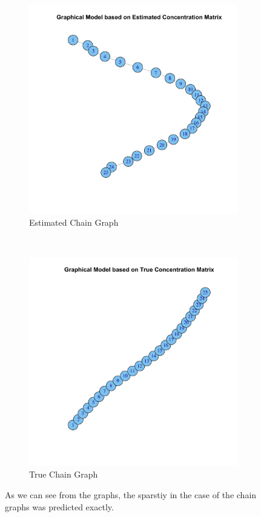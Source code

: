 \documentclass[12pt, leqno]{article}
\begin{document}
\begin{figure}
\centering 
\begin{subfigure}[b]{0.5\textwidth}
  \includegraphics[width=\textwidth]{chaingraphicalmodelestimate.pdf}
  \caption{Estimated Chain Graph}
\label{fig:chaingaphsestimate}
\end{subfigure}\\
\begin{subfigure}[b]{0.5\textwidth}
  \includegraphics [width=\textwidth]{chaingraphicalmodelactual.pdf}
  \caption{True Chain Graph}
\label{fig:chaingaphsactual}
\end{subfigure}
        \caption{As we can see from the graphs, the sparstiy in the
          case of the chain graphs was predicted exactly.}\label{fig:chaingraphs}
\end{figure}
\end{document}
